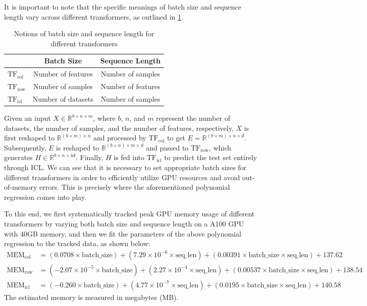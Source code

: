 \documentclass{article}
\theoremstyle{plain}
\theoremstyle{definition}
\theoremstyle{remark}
\newcommand{\TFcol}{\text{TF}_{\text{col}}}
\newcommand{\TFrow}{\text{TF}_{\text{row}}}
\newcommand{\TFicl}{\text{TF}_{\text{icl}}}
\newcommand{\MEMcol}{\text{MEM}_{\text{col}}}
\newcommand{\MEMrow}{\text{MEM}_{\text{row}}}
\newcommand{\MEMicl}{\text{MEM}_{\text{icl}}}
\begin{document}
It is important to note that the specific meanings of batch size and sequence length vary across different transformers, as outlined in \cref{tab:transformer_notions}.

\begin{table}[htbp]
    \centering
    \renewcommand{\arraystretch}{1.3}
    \begin{tabular}{lcc}
        \toprule
                          & \textbf{Batch Size}        & \textbf{Sequence Length}    \\ 
        \midrule
        $\TFcol$ & Number of features        & Number of samples  \\ 
        $\TFrow$ & Number of samples        & Number of features \\ 
        $\TFicl$ & Number of datasets       & Number of samples  \\ 
        \bottomrule
    \end{tabular}
    \caption{Notions of batch size and sequence length for different transformers}
    \label{tab:transformer_notions}
\end{table}

Given an input \( X \in \mathbb{R}^{b \times n \times m} \), where \( b \), \( n \), and \( m \) represent the number of datasets, the number of samples, and the number of features, respectively, \( X \) is first reshaped to \( \mathbb{R}^{(b \times m) \times n} \) and processed by $\TFcol$ to get \( E = \mathbb{R}^{(b \times m) \times n \times d} \). Subsequently, \( E \) is reshaped to \( \mathbb{R}^{(b \times n) \times m \times d} \) and passed to $\TFrow$, which generates \( H \in \mathbb{R}^{b \times n \times 4d} \). Finally, \( H \) is fed into $\TFicl$ to predict the test set entirely through ICL. We can see that it is necessary to set appropriate batch sizes for different transformers in order to efficiently utilize GPU resources and avoid out-of-memory errors. This is precisely where the aforementioned polynomial regression comes into play.

To this end, we first systematically tracked peak GPU memory usage of different transformers by varying both batch size and sequence length on a A100 GPU with 40GB memory, and then we fit the parameters of the above polynomial regression to the tracked data, as shown below:
\begin{align}
    \MEMcol &= (0.0708 \times \text{batch\_size}) + (7.29 \times 10^{-6} \times \text{seq\_len}) + (0.00391 \times \text{batch\_size} \times \text{seq\_len}) + 137.62  \nonumber \\
    \MEMrow &= (-2.07 \times 10^{-5} \times \text{batch\_size}) + (2.27 \times 10^{-4} \times \text{seq\_len}) + (0.00537 \times \text{batch\_size} \times \text{seq\_len}) + 138.54  \nonumber \\
    \MEMicl &= (-0.260 \times \text{batch\_size}) + (4.77 \times 10^{-7} \times \text{seq\_len}) + (0.0195 \times \text{batch\_size} \times \text{seq\_len}) + 140.58  \nonumber
\end{align}
The estimated memory is measured in megabytes (MB).
\end{document}
